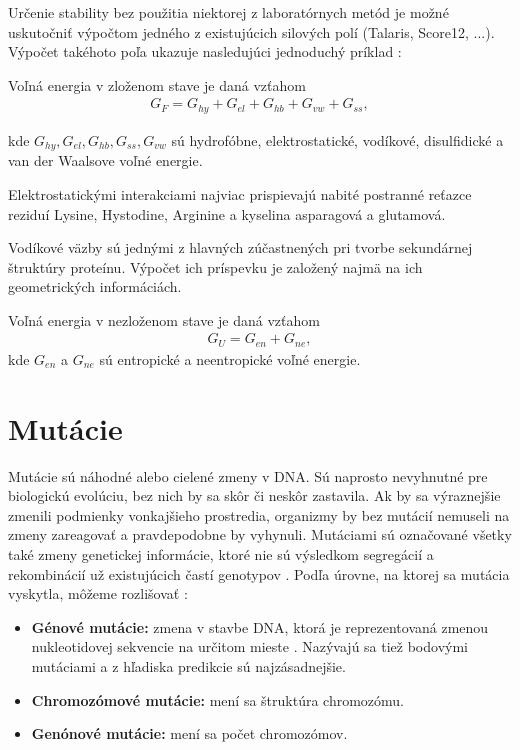 Určenie stability bez použitia niektorej z laboratórnych metód je možné uskutočniť výpočtom jedného z existujúcich silových polí (Talaris, Score12, ...). Výpočet takéhoto poľa ukazuje nasledujúci jednoduchý príklad \cite{free_energy} \cite{gromiha}:

Voľná energia v zloženom stave je daná vzťahom  
	\begin{align}
		G_{F} = G_{hy} + G_{el} + G_{hb} + G_{vw} + G_{ss},
	\end{align}

kde $G_{hy}, G_{el}, G_{hb}, G_{ss}, G_{vw}$ sú hydrofóbne, elektrostatické, vodíkové, disulfidické a van der Waalsove voľné energie. 


Elektrostatickými interakciami najviac prispievajú nabité postranné reťazce reziduí Lysine, Hystodine, Arginine a kyselina asparagová a glutamová.

Vodíkové väzby sú jednými z hlavných zúčastnených pri tvorbe sekundárnej štruktúry proteínu. Výpočet ich príspevku je založený najmä na ich geometrických informáciách.

Voľná energia v nezloženom stave je daná vzťahom
\begin{align}
	G_U = G_{en} + G_{ne},
\end{align}
kde $G_{en}$ a $G_{ne}$ sú entropické a neentropické voľné energie.


\section{Mutácie}
Mutácie sú náhodné alebo cielené zmeny v DNA. Sú naprosto nevyhnutné pre biologickú evolúciu, bez nich by sa skôr či neskôr zastavila. Ak by sa výraznejšie zmenili podmienky vonkajšieho prostredia, organizmy by bez mutácií nemuseli na zmeny zareagovať a pravdepodobne by vyhynuli. Mutáciami sú označované všetky také zmeny genetickej informácie, ktoré nie sú výsledkom segregácií a rekombinácií už existujúcich častí genotypov \cite{mutace}. 
Podľa úrovne, na ktorej sa mutácia vyskytla, môžeme rozlišovať \cite{flegr}:
\begin{itemize}
	\item \textbf{Génové mutácie:} zmena v stavbe DNA, ktorá je reprezentovaná zmenou nukleotidovej sekvencie na určitom mieste \cite{mutace}. Nazývajú sa tiež bodovými mutáciami a z hľadiska predikcie sú najzásadnejšie.
	\item \textbf{Chromozómové mutácie:} mení sa štruktúra chromozómu.
	\item \textbf{Genónové mutácie:}  mení sa počet chromozómov.
\end{itemize}

